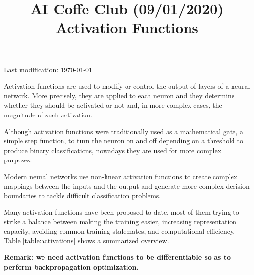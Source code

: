 \documentclass{article}
\begin{document}
\title{AI Coffe Club (09/01/2020)\\ Activation Functions}
\date{}

\maketitle

\begin{center}
Last modification: \today\\
\end{center}

Activation functions are used to modify or control the output of layers of a neural network. More precisely, they are applied to each neuron and they determine whether they should be activated or not and, in more complex cases, the magnitude of such activation.

Although activation functions were traditionally used as a mathematical gate, a simple step function, to turn the neuron on and off depending on a threshold to produce binary classifications, nowadays they are used for more complex purposes.

Modern neural networks use non-linear activation functions to create complex mappings between the inputs and the output and generate more complex decision boundaries to tackle difficult classification problems.

Many activation functions have been proposed to date, most of them trying to strike a balance between making the training easier, increasing representation capacity, avoiding common training stalemates, and computational efficiency. Table \ref{table:activations} shows a summarized overview.

\textbf{Remark: we need activation functions to be differentiable so as to perform backpropagation optimization.}
\end{document}
